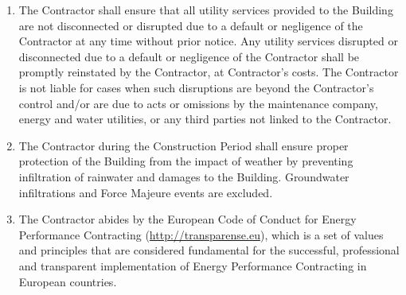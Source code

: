 \begin{multicols}{2}
\begin{enumerate}
	\item	The Contractor shall ensure that all utility services provided to the Building are not disconnected or disrupted due to a default or negligence of the Contractor at any time without prior notice. Any utility services disrupted or disconnected due to a default or negligence of the Contractor shall be promptly reinstated by the Contractor, at Contractor’s costs. The Contractor is not liable for cases when such disruptions are beyond the Contractor’s control and/or are due to acts or omissions by the maintenance company, energy and water utilities, or any third parties not linked to the Contractor.
	\item	The Contractor during the Construction Period shall ensure proper protection of the Building from the impact of weather by preventing infiltration of rainwater and damages to the Building. Groundwater infiltrations and Force Majeure events are excluded.
	\item	The Contractor abides by the European Code of Conduct for Energy Performance Contracting (\url{http://transparense.eu}), which is a set of values and principles that are considered fundamental for the successful, professional and transparent implementation of Energy Performance Contracting in European countries.
\end{enumerate}


\end{multicols}
